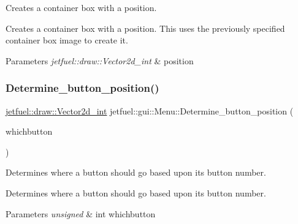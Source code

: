 Creates a container box with a position. 

Creates a container box with a position. This uses the previously specified container box image to create it.


\begin{DoxyParams}{Parameters}
{\em jetfuel\+::draw\+::\+Vector2d\+\_\+int} & position \\
\hline
\end{DoxyParams}
\mbox{\label{classjetfuel_1_1gui_1_1Menu_a9432e513bdc7deefab9da0f596144dc5}} 
\subsubsection{\texorpdfstring{Determine\+\_\+button\+\_\+position()}{Determine\_button\_position()}}
{\footnotesize\ttfamily \hyperlink{classjetfuel_1_1draw_1_1Vector2d}{jetfuel\+::draw\+::\+Vector2d\+\_\+int} jetfuel\+::gui\+::\+Menu\+::\+Determine\+\_\+button\+\_\+position (\begin{DoxyParamCaption}\item[{unsigned int}]{whichbutton }\end{DoxyParamCaption})\hspace{0.3cm}{\ttfamily [protected]}}



Determines where a button should go based upon it\textquotesingle{}s button number. 

Determines where a button should go based upon it\textquotesingle{}s button number.


\begin{DoxyParams}{Parameters}
{\em unsigned} & int whichbutton \\
\hline
\end{DoxyParams}
\mbox{\label{classjetfuel_1_1gui_1_1Menu_a311940611ef799e82a1d412618c6206a}} 
